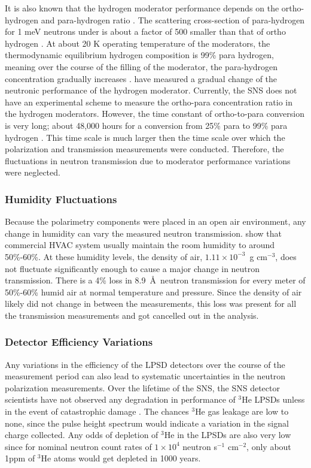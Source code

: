 It is also known that the hydrogen moderator performance depends on the ortho-hydrogen and para-hydrogen ratio \cite{Squires1955, Ooi2011}. The scattering cross-section of para-hydrogen for 1 meV neutrons under is about a factor of 500 smaller than that of ortho hydrogen \cite{Grammer2015}. At about 20 K operating temperature of the moderators, the thermodynamic equilibrium hydrogen composition is 99\% para hydrogen, meaning over the course of the filling of the moderator, the para-hydrogen concentration gradually increases \cite{Ooi2011, Kai2005}. \cite{Ooi2006} have measured a gradual change of the neutronic performance of the hydrogen moderator. Currently, the SNS does not have an experimental scheme to measure the ortho-para concentration ratio in the hydrogen moderators. However, the time constant of ortho-to-para conversion is very long; about 48,000 hours for a conversion from 25\% para to 99\% para hydrogen \cite{Ooi2011}. This time scale is much larger then the time scale over which the polarization and transmission measurements were conducted. Therefore, the fluctuations in neutron transmission due to moderator performance variations were neglected.

\subsubsection{Humidity Fluctuations}

Because the polarimetry components were placed in an open air environment, any change in humidity can vary the measured neutron transmission. \cite{Zhang2023} show that commercial HVAC system usually maintain the room humidity to around 50\%-60\%. At these humidity levels, the density of air, $1.11\times10^{-3}$~g cm$^{-3}$, does not fluctuate significantly enough to cause a major change in neutron transmission. There is a 4\% loss in 8.9~\AA\ neutron transmission for every meter of 50\%-60\% humid air at normal temperature and pressure. Since the density of air likely did not change in between the measurements, this loss was present for all the transmission measurements and got cancelled out in the analysis. 

\subsubsection{Detector Efficiency Variations}

Any variations in the efficiency of the LPSD detectors over the course of the measurement period can also lead to systematic uncertainties in the neutron polarization measurements. Over the lifetime of the SNS, the SNS detector scientists have not observed any degradation in performance of $^3$He LPSDs unless in the event of catastrophic damage \cite{Berry2023}. The chances $^3$He gas leakage are low to none, since the pulse height spectrum would indicate a variation in the signal charge collected. Any odds of depletion of $^3$He in the LPSDs are also very low since for nominal neutron count rates of $1\times10^4$ neutron s$^{-1}$ cm$^{-2}$, only about 1ppm of $^3$He atoms would get depleted in 1000 years. 

